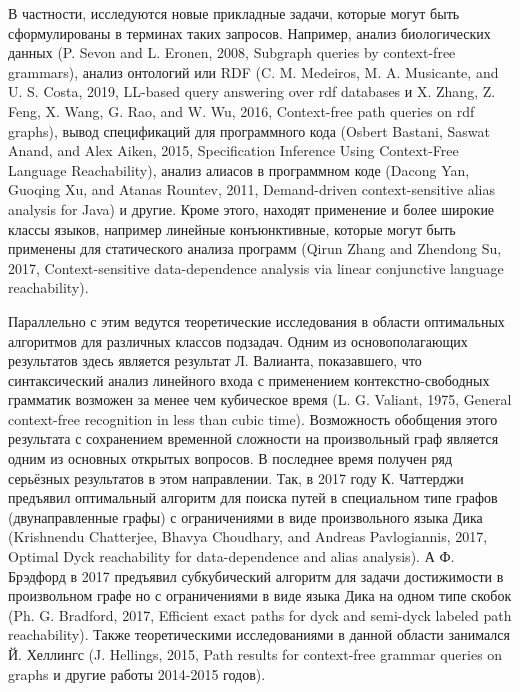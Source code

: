 \documentclass[12pt]{article}  %
\theoremstyle{remark}
\begin{document}
В частности, исследуются новые прикладные задачи, которые могут быть сформулированы в терминах таких запросов. Например, анализ биологических данных (P. Sevon and L. Eronen, 2008, Subgraph queries by context-free grammars), анализ онтологий или RDF (C. M. Medeiros, M. A. Musicante, and U. S. Costa, 2019, LL-based query answering over rdf databases и X. Zhang, Z. Feng, X. Wang, G. Rao, and W. Wu, 2016, Context-free path queries on rdf graphs), вывод спецификаций для программного кода (Osbert Bastani, Saswat Anand, and Alex Aiken, 2015, Specification Inference Using Context-Free Language Reachability), анализ алиасов в программном коде (Dacong Yan, Guoqing Xu, and Atanas Rountev, 2011, Demand-driven context-sensitive alias analysis for Java) и другие. Кроме этого, находят применение и более широкие классы языков, например линейные конъюнктивные, которые могут быть применены для статического анализа программ (Qirun Zhang and Zhendong Su, 2017, Context-sensitive data-dependence analysis via linear conjunctive language reachability).

Параллельно с этим ведутся теоретические исследования в области оптимальных алгоритмов для различных классов подзадач. Одним из основополагающих результатов здесь является результат Л. Валианта, показавшего, что синтаксический анализ линейного входа с применением контекстно-свободных грамматик возможен за менее чем кубическое время (L. G. Valiant, 1975, General context-free recognition in less than cubic time). Возможность обобщения этого результата с сохранением временной сложности на произвольный граф является одним из основных открытых вопросов. В последнее время получен ряд серьёзных результатов в этом направлении. Так, в 2017 году К. Чаттерджи предъявил оптимальный алгоритм для поиска путей в специальном типе графов (двунаправленные графы) с ограничениями в виде произвольного языка Дика (Krishnendu Chatterjee, Bhavya Choudhary, and Andreas Pavlogiannis, 2017, Optimal Dyck reachability for data-dependence and alias analysis). А Ф. Брэдфорд в 2017 предъявил субкубический алгоритм для задачи достижимости в произвольном графе но с ограничениями в виде языка Дика на одном типе скобок (Ph. G. Bradford, 2017, Efficient exact paths for dyck and semi-dyck labeled path reachability). Также теоретическими исследованиями в данной области занимался Й. Хеллингс (J. Hellings, 2015, Path results for context-free grammar queries on graphs и другие работы 2014-2015 годов).
\end{document}
